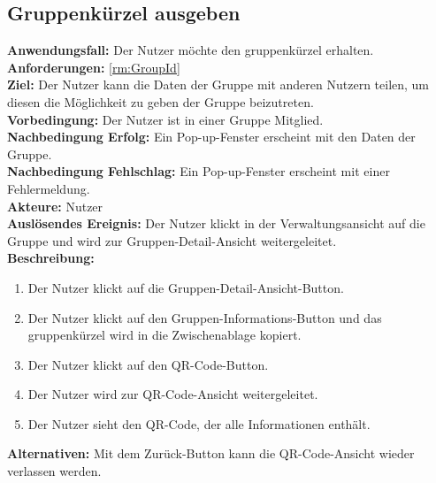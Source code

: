 \documentclass[parskip=full]{scrartcl}
\begin{document}
\subsection{Gruppenkürzel ausgeben}
\textbf{Anwendungsfall:} Der Nutzer möchte den \gls{gruppenkürzel} erhalten.\\
\textbf{Anforderungen:} \ref{rm:GroupId}\\
\textbf{Ziel:} Der Nutzer kann die Daten der Gruppe mit anderen Nutzern teilen, um diesen die Möglichkeit zu geben der Gruppe beizutreten.\\
\textbf{Vorbedingung:} Der Nutzer ist in einer Gruppe Mitglied.\\
\textbf{Nachbedingung Erfolg:} Ein Pop-up-Fenster erscheint mit den Daten der Gruppe.\\
\textbf{Nachbedingung Fehlschlag:} Ein Pop-up-Fenster erscheint mit einer Fehlermeldung.\\
\textbf{Akteure:} Nutzer \\
\textbf{Auslösendes Ereignis:} Der Nutzer klickt in der Verwaltungsansicht auf die Gruppe und wird zur Gruppen-Detail-Ansicht weitergeleitet.\\
\textbf{Beschreibung:}
\begin{enumerate}
    \item Der Nutzer klickt auf die Gruppen-Detail-Ansicht-Button.
    \item Der Nutzer klickt auf den Gruppen-Informations-Button und das \gls{gruppenkürzel} wird in die Zwischenablage kopiert.
    \item Der Nutzer klickt auf den QR-Code-Button.
    \item Der Nutzer wird zur QR-Code-Ansicht weitergeleitet.
    \item Der Nutzer sieht den QR-Code, der alle Informationen enthält.
\end{enumerate}
\textbf{Alternativen:} Mit dem Zurück-Button kann die QR-Code-Ansicht wieder verlassen werden.
\newpage
\end{document}
